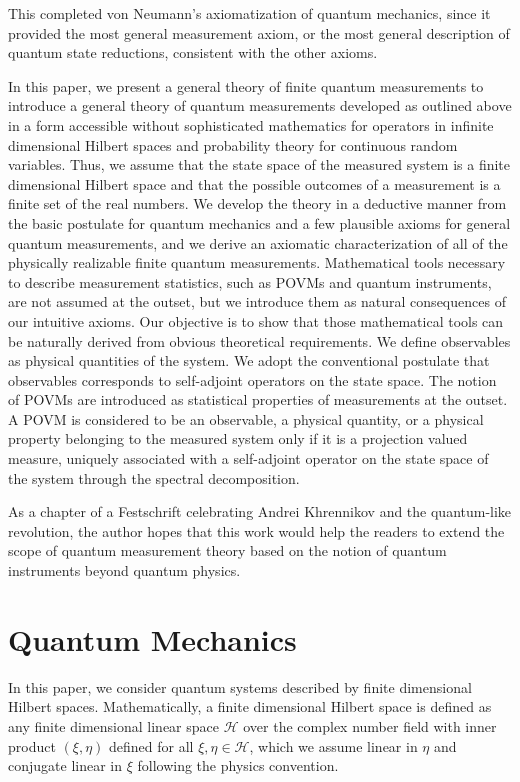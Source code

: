 \documentclass[12pt]{article}
\newcommand{\cH}{{\mathcal H}}
\newcommand{\et}{\eta}
\begin{document}
This completed von Neumann's axiomatization of quantum mechanics,
since it provided the most general measurement axiom, or the most
general description of quantum state reductions,  consistent with the
other axioms.

In this paper, we present a general theory of finite quantum measurements
to introduce a general theory of quantum measurements developed as outlined above 
in a form accessible 
without sophisticated mathematics for operators in infinite dimensional Hilbert spaces
and probability theory for continuous random variables.
Thus, we assume that the state space of the measured system is a finite dimensional Hilbert space
and that the possible outcomes of a measurement is a finite set of the real numbers.
We develop the theory in a deductive manner from the basic postulate for quantum 
mechanics and a few plausible axioms for general quantum measurements,
and we derive an axiomatic characterization of all of the physically realizable
finite quantum measurements. 
Mathematical tools necessary to describe measurement statistics, such as POVMs 
and quantum instruments, are not assumed at the outset, but we introduce
them as natural consequences of our intuitive axioms.  Our objective is to show 
that those mathematical tools can be naturally derived from obvious theoretical requirements.    
We define observables as physical quantities of the system. We adopt the
conventional postulate that observables corresponds to self-adjoint operators 
on the state space.  The notion of POVMs are introduced as statistical properties
of measurements at the outset. 
A POVM is considered to be an observable,  a physical quantity, 
or a physical property belonging to the measured system only if it is a projection valued
measure, uniquely associated with a self-adjoint operator on the state space of the
system through the spectral decomposition.

As a chapter of a Festschrift celebrating Andrei Khrennikov and 
the quantum-like revolution,  the author hopes that this work would help the readers 
to extend the scope of quantum measurement theory based on the notion of quantum 
instruments beyond quantum physics.

\section{Quantum Mechanics}

In this paper, we consider quantum systems described by finite dimensional Hilbert spaces.
Mathematically, a finite dimensional Hilbert space is defined as any finite dimensional
linear space $\cH$ over the complex number field with inner product $(\xi,\et)$ defined
for all $\xi,\et\in\cH$, which we assume linear in $\et$ and conjugate linear in $\xi$
 following the physics convention.
 
\end{document}
